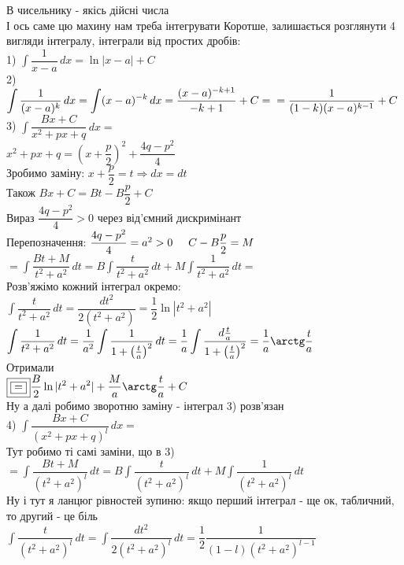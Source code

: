 \documentclass[a4paper, 14pt]{extarticle}
\def\huge{\displaystyle}
\def\bigline{\vspace{5mm}\\}
\theoremstyle{theoremdd}
\theoremstyle{theoremdd}
\theoremstyle{theoremdd}
\theoremstyle{theoremdd}
\theoremstyle{theoremdd}
\theoremstyle{theoremdd}
\theoremstyle{theoremdd}
\theoremstyle{theoremdd}
\begin{document}
В чисельнику - якісь дійсні числа\\
І ось саме цю махину нам треба інтегрувати
Коротше, залишається розглянути 4 вигляди інтегралу, інтеграли від простих дробів:
\bigline
1) $\huge \int \dfrac{1}{x-a}\,dx = \ln|x-a| + C$
\bigline
2) $\huge \int \dfrac{1}{(x-a)^k}\,dx = \int (x-a)^{-k}\,dx = \dfrac{(x-a)^{-k+1}}{-k+1} + C = \\ = \dfrac{1}{(1-k)(x-a)^{k-1}} + C$
\bigline
3) $\huge \int \dfrac{Bx+C}{x^2+px+q}\,dx \boxed{=}$ \medskip \\
$x^2 + px + q = \left(x + \dfrac{p}{2} \right)^2 + \dfrac{4q-p^2}{4}$\\
Зробимо заміну: $x + \dfrac{p}{2} = t \Rightarrow dx = dt$\\
Також $Bx+C = Bt - B\dfrac{p}{2} + C$\\
Вираз $\dfrac{4q-p^2}{4} > 0$ через від'ємний дискримінант\\
Перепозначення: $\dfrac{4q-p^2}{4} = a^2 > 0 \hspace{0.5cm} C - B \dfrac{p}{2} = M$ \medskip \\
$\boxed{=} \huge \int \dfrac{Bt + M}{t^2 + a^2}\,dt = B \int \dfrac{t}{t^2+a^2}\,dt + M \int \dfrac{1}{t^2+a^2}\,dt \boxed{\boxed{=}}$ \medskip \\
Розв'яжімо кожний інтеграл окремо:\\
$\huge \int \dfrac{t}{t^2+a^2}\,dt = \dfrac{dt^2}{2(t^2+a^2)} = \dfrac{1}{2} \ln|t^2+a^2|$\\
$\huge \int \dfrac{1}{t^2+a^2}\,dt = \dfrac{1}{a^2} \int \dfrac{1}{1 + \left(\frac{t}{a}\right)^2}\,dt = \dfrac{1}{a} \int \dfrac{d \frac{t}{a}}{1 + \left(\frac{t}{a}\right)^2} = \dfrac{1}{a} \arctg \dfrac{t}{a}$ \\
Отримали \medskip \\
$\boxed{\boxed{=}} \huge \frac{B}{2} \ln|t^2+a^2| + \frac{M}{a} \arctg \frac{t}{a} + C$\\
Ну а далі робимо зворотню заміну - інтеграл 3) розв'язан
\bigline
4) $\huge \int \dfrac{Bx+C}{(x^2+px+q)^l}\,dx \boxed{=}$\\
Тут робимо ті самі заміни, що в 3)\\
$\boxed{=} \huge \int \dfrac{Bt+M}{(t^2+a^2)^l}\,dt = B \int \dfrac{t}{(t^2+a^2)^l} \,dt + M \int \dfrac{1}{(t^2+a^2)^l}\,dt$\\
Ну і тут я ланцюг рівностей зупиню: якщо перший інтеграл - ще ок, табличний, то другий - це біль\\
$\huge \int \dfrac{t}{(t^2+a^2)^l}\,dt = \int \dfrac{dt^2}{2(t^2+a^2)^l}\,dt = \dfrac{1}{2} \dfrac{1}{(1-l)(t^2+a^2)^{l-1}} $\bigline
\end{document}
